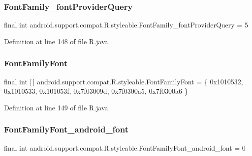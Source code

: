 \subsubsection{\texorpdfstring{FontFamily\_fontProviderQuery}{FontFamily\_fontProviderQuery}}
{\footnotesize\ttfamily final int android.\+support.\+compat.\+R.\+styleable.\+Font\+Family\+\_\+font\+Provider\+Query = 5\hspace{0.3cm}{\ttfamily [static]}}



Definition at line 148 of file R.\+java.

\mbox{\label{classandroid_1_1support_1_1compat_1_1_r_1_1styleable_a751b3f66192df6e0e2ae522e910b0a9c}} 
\subsubsection{\texorpdfstring{FontFamilyFont}{FontFamilyFont}}
{\footnotesize\ttfamily final int \mbox{[}$\,$\mbox{]} android.\+support.\+compat.\+R.\+styleable.\+Font\+Family\+Font = \{ 0x1010532, 0x1010533, 0x101053f, 0x7f03009d, 0x7f0300a5, 0x7f0300a6 \}\hspace{0.3cm}{\ttfamily [static]}}



Definition at line 149 of file R.\+java.

\mbox{\label{classandroid_1_1support_1_1compat_1_1_r_1_1styleable_af1f1b88c80298126d5c3bcf142ae0b65}} 
\subsubsection{\texorpdfstring{FontFamilyFont\_android\_font}{FontFamilyFont\_android\_font}}
{\footnotesize\ttfamily final int android.\+support.\+compat.\+R.\+styleable.\+Font\+Family\+Font\+\_\+android\+\_\+font = 0\hspace{0.3cm}{\ttfamily [static]}}



